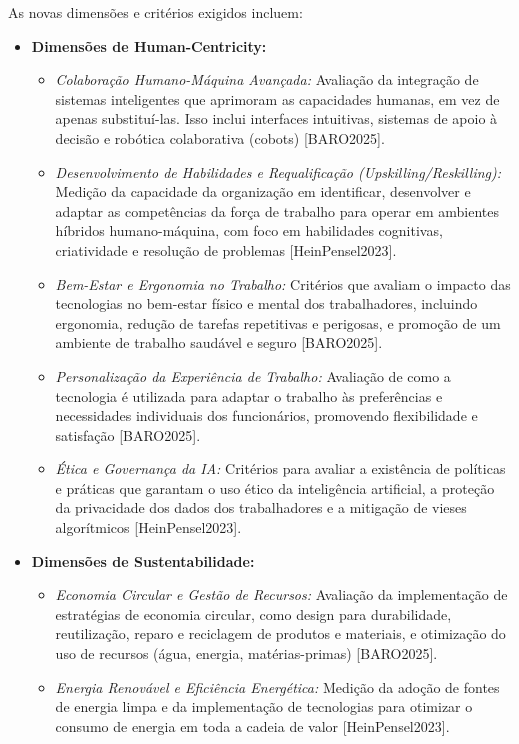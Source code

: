 As novas dimensões e critérios exigidos incluem:
\begin{itemize}
    \item \textbf{Dimensões de Human-Centricity:}
    \begin{itemize}
        \item \textit{Colaboração Humano-Máquina Avançada:} Avaliação da integração de sistemas inteligentes que aprimoram as capacidades humanas, em vez de apenas substituí-las. Isso inclui interfaces intuitivas, sistemas de apoio à decisão e robótica colaborativa (cobots) [BARO2025].
        \item \textit{Desenvolvimento de Habilidades e Requalificação (Upskilling/Reskilling):} Medição da capacidade da organização em identificar, desenvolver e adaptar as competências da força de trabalho para operar em ambientes híbridos humano-máquina, com foco em habilidades cognitivas, criatividade e resolução de problemas [HeinPensel2023].
        \item \textit{Bem-Estar e Ergonomia no Trabalho:} Critérios que avaliam o impacto das tecnologias no bem-estar físico e mental dos trabalhadores, incluindo ergonomia, redução de tarefas repetitivas e perigosas, e promoção de um ambiente de trabalho saudável e seguro [BARO2025].
        \item \textit{Personalização da Experiência de Trabalho:} Avaliação de como a tecnologia é utilizada para adaptar o trabalho às preferências e necessidades individuais dos funcionários, promovendo flexibilidade e satisfação [BARO2025].
        \item \textit{Ética e Governança da IA:} Critérios para avaliar a existência de políticas e práticas que garantam o uso ético da inteligência artificial, a proteção da privacidade dos dados dos trabalhadores e a mitigação de vieses algorítmicos [HeinPensel2023].
    \end{itemize}
    \item \textbf{Dimensões de Sustentabilidade:}
    \begin{itemize}
        \item \textit{Economia Circular e Gestão de Recursos:} Avaliação da implementação de estratégias de economia circular, como design para durabilidade, reutilização, reparo e reciclagem de produtos e materiais, e otimização do uso de recursos (água, energia, matérias-primas) [BARO2025].
        \item \textit{Energia Renovável e Eficiência Energética:} Medição da adoção de fontes de energia limpa e da implementação de tecnologias para otimizar o consumo de energia em toda a cadeia de valor [HeinPensel2023].

\end{itemize}
\end{itemize}
